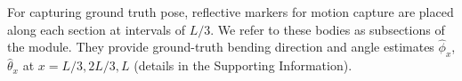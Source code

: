 For capturing ground truth pose, reflective markers for motion capture are placed along each section at intervals of $L/3$. We refer to these bodies as subsections of the module. They provide ground-truth bending direction and angle estimates $\hat{\phi}_x$, $\hat{\theta}_x$ at $x = L/3, 2L/3, L$ (details in the Supporting Information).
